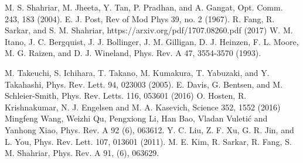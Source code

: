 \documentclass[aps,pra,letterpaper,superscriptaddress,showpacs,amsmath,floats,twocolumn]{revtex4-1}
\begin{document}
{{{{{\begin{thebibliography}{100}
 M. S. Shahriar, M. Jheeta, Y. Tan, P. Pradhan, and A. Gangat, Opt. Comm. 243, 183 (2004).
 E. J. Post, Rev of Mod Phys 39, no. 2 (1967).
 R. Fang, R. Sarkar, and S. M. Shahriar, https://arxiv.org/pdf/1707.08260.pdf (2017)
 W. M. Itano, J. C. Bergquist, J. J. Bollinger, J. M. Gilligan, D. J. Heinzen, F. L. Moore, M. G. Raizen, and D. J. Wineland, Phys. Rev. A 47, 3554-3570 (1993).


 M. Takeuchi, S. Ichihara, T. Takano, M. Kumakura, T. Yabuzaki, and Y. Takahashi, Phys. Rev. Lett. 94, 023003 (2005).
 E. Davis, G. Bentsen, and M. Schleier-Smith, Phys. Rev. Letts. 116, 053601 (2016)
 O. Hosten, R. Krishnakumar, N. J. Engelsen and M. A. Kasevich, Science 352, 1552 (2016)
 Mingfeng Wang, Weizhi Qu, Pengxiong Li, Han Bao, Vladan Vuleti\'c and Yanhong Xiao, Phys. Rev. A 92 (6), 063612.
 Y. C. Liu, Z. F. Xu, G. R. Jin, and L. You, Phys. Rev. Lett. 107, 013601 (2011).
 M. E. Kim, R. Sarkar, R. Fang, S. M. Shahriar, Phys. Rev. A 91, (6), 063629.


\end{thebibliography}}}}}}
\end{document}
